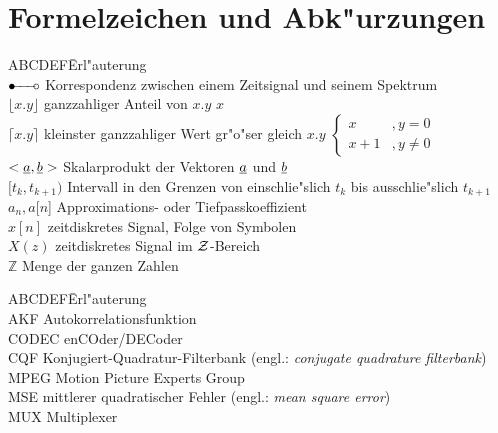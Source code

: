 %
%
\chapter*{Formelzeichen und Abk"urzungen}
%
\begin{tabbing}
ABCDEF\=Erl"auterung\kill\\
$\korresp$	\> Korrespondenz zwischen einem Zeitsignal und seinem Spektrum\\
$\lfloor x.y \rfloor$ \> ganzzahliger Anteil von $x.y$ \lt $x $\\
$\lceil x.y \rceil$ \> kleinster ganzzahliger Wert gr"o"ser gleich $x.y$ \lt $\left\{ \begin{array}{cl}
					x 	& , y=0\\
					x+1	& , y\neq 0
					\end{array}\right.$\\
$<\underline{a}, \underline{b}>$	\> Skalarprodukt der Vektoren $\underline{a}$ und $\underline{b}$\\
$[t_k,t_{k+1})$	\> Intervall in den Grenzen von einschlie"slich $t_k$ bis ausschlie"slich $t_{k+1}$\\
$a_n, a[n$]	\>Approximations- oder Tiefpasskoeffizient \\
$x[n]$		\>zeitdiskretes Signal, Folge von Symbolen	\\
$X(z)$		\>zeitdiskretes Signal im $\cal{Z}$-Bereich	\\
${\mathds{Z}}$	\> Menge der ganzen Zahlen
\end{tabbing}
\vfil
\begin{tabbing}
ABCDEF\=Erl"auterung\kill\\
AKF	\> Autokorrelationsfunktion\\
CODEC	\> enCOder/DECoder \\
CQF	\> Konjugiert-Quadratur-Filterbank (engl.: {\em conjugate quadrature filterbank}) \\
MPEG	\> Motion Picture Experts Group	\\
MSE	\> mittlerer quadratischer Fehler (engl.: {\em mean square error}) \\
MUX	\> Multiplexer \\
\end{tabbing}

